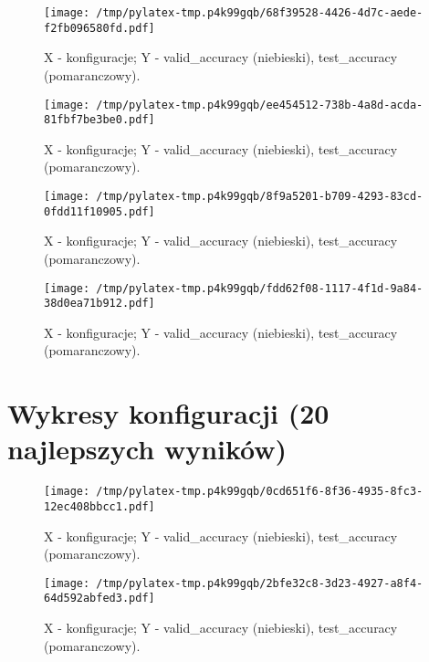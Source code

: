 \documentclass{article}%
\begin{document}
%
\newpage%


\begin{figure}[h]%
\centering%
\texttt{[image: /tmp/pylatex-tmp.p4k99gqb/68f39528-4426-4d7c-aede-f2fb096580fd.pdf]}%
\caption{X {-} konfiguracje; Y {-} valid\_accuracy (niebieski), test\_accuracy (pomaranczowy).}%
\end{figure}

%
\newpage%


\begin{figure}[h]%
\centering%
\texttt{[image: /tmp/pylatex-tmp.p4k99gqb/ee454512-738b-4a8d-acda-81fbf7be3be0.pdf]}%
\caption{X {-} konfiguracje; Y {-} valid\_accuracy (niebieski), test\_accuracy (pomaranczowy).}%
\end{figure}

%
\newpage%


\begin{figure}[h]%
\centering%
\texttt{[image: /tmp/pylatex-tmp.p4k99gqb/8f9a5201-b709-4293-83cd-0fdd11f10905.pdf]}%
\caption{X {-} konfiguracje; Y {-} valid\_accuracy (niebieski), test\_accuracy (pomaranczowy).}%
\end{figure}

%
\newpage%


\begin{figure}[h]%
\centering%
\texttt{[image: /tmp/pylatex-tmp.p4k99gqb/fdd62f08-1117-4f1d-9a84-38d0ea71b912.pdf]}%
\caption{X {-} konfiguracje; Y {-} valid\_accuracy (niebieski), test\_accuracy (pomaranczowy).}%
\end{figure}

%
\newpage

%
\section{Wykresy konfiguracji (20 najlepszych wyników)}%
\label{sec:Wykresykonfiguracji(20najlepszychwynikw)}%


\begin{figure}[h]%
\centering%
\texttt{[image: /tmp/pylatex-tmp.p4k99gqb/0cd651f6-8f36-4935-8fc3-12ec408bbcc1.pdf]}%
\caption{X {-} konfiguracje; Y {-} valid\_accuracy (niebieski), test\_accuracy (pomaranczowy).}%
\end{figure}

%
\newpage%


\begin{figure}[h]%
\centering%
\texttt{[image: /tmp/pylatex-tmp.p4k99gqb/2bfe32c8-3d23-4927-a8f4-64d592abfed3.pdf]}%
\caption{X {-} konfiguracje; Y {-} valid\_accuracy (niebieski), test\_accuracy (pomaranczowy).}%
\end{figure}
\end{document}
